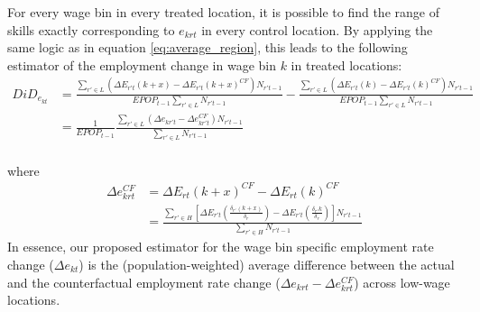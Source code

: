 For every wage bin in every treated location, it is possible to find the range of skills exactly corresponding to $e_{krt}$ in every control location. By applying the same logic as in equation \ref{eq:average_region}, this leads to the following estimator of the employment change in wage bin $k$ in treated locations:
\begin{equation} \label{eq:empirical_estimator}
\begin{split}
 DiD_{e_{kt}} & = {\frac{\sum_{r'\in L}(\Delta E_{r't}(k+x) - \Delta E_{r't}(k+x)^{CF})N_{r't-1}}{EPOP_{t-1} \sum_{r'\in L}N_{r't-1}}} - {\frac{\sum_{r'\in L}(\Delta E_{r't}(k) - \Delta E_{r't}(k)^{CF})N_{r't-1}}{EPOP_{t-1} \sum_{r'\in L}N_{r't-1}}} \\
 & = \frac{1}{EPOP_{t-1}}  {\frac{\sum_{r'\in L}(\Delta e_{kr't} -  \Delta e_{kr't}^{CF})N_{r't-1}}{ \sum_{r'\in L}N_{r't-1}}} \\
\end{split}
\end{equation}

where 
\begin{equation}\label{eq:empirical_CF}
\begin{split}
 \Delta e_{krt}^{CF} & =\Delta E_{rt}(k+x)^{CF} - \Delta E_{rt}(k)^{CF} \\
 &= \frac{\sum_{r'\in H}\left[\Delta E_{r't}\left(\frac{\delta_{r'}(k+x)}{\delta_{r}}\right) - \Delta E_{r't}\left( \frac{\delta_{r'}k}{\delta_{r}}\right) \right]N_{r't-1}}{\sum_{r'\in H}N_{r't-1}}
 \end{split}
\end{equation}
In essence, our proposed estimator for the wage bin specific employment rate change ($\Delta e_{kt}$) is the (population-weighted) average difference between the actual and the counterfactual employment rate change ($\Delta e_{krt}-\Delta e_{krt}^{CF}$) across low-wage locations. 

